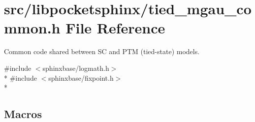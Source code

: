 \section{src/libpocketsphinx/tied\-\_\-mgau\-\_\-common.h File Reference}
\label{tied__mgau__common_8h}


Common code shared between S\-C and P\-T\-M (tied-\/state) models.  


{\ttfamily \#include $<$sphinxbase/logmath.\-h$>$}\\*
{\ttfamily \#include $<$sphinxbase/fixpoint.\-h$>$}\\*
\subsection*{Macros}
